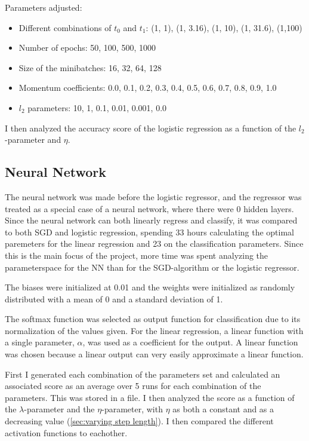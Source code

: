 \documentclass[a4paper, UKenglish]{article}
\newcommand{\0}{\mathbf{0}}
\newcommand{\1}{\mathbf{1}}
\begin{document}
Parameters adjusted:
\begin{itemize}
\item Different combinations of $t_0$ and $t_1$: (1, 1), (1, 3.16), (1, 10), (1, 31.6), (1,100)
\item Number of epochs: 50, 100, 500, 1000
\item Size of the minibatches: 16, 32, 64, 128
\item Momentum coefficients: 0.0, 0.1, 0.2, 0.3, 0.4, 0.5, 0.6, 0.7, 0.8, 0.9, 1.0
\item $l_2$ parameters: 10, 1, 0.1, 0.01, 0.001, 0.0
\end{itemize}

I then analyzed the accuracy score of the logistic regression as a function of the $l_2$-parameter and $\eta$.

\subsection{Neural Network} \label{sec:NN method}
The neural network was made before the logistic regressor, and the regressor was treated as a special case of a neural network, where there were 0 hidden layers. Since the neural network can both linearly regress and classify, it was compared to both SGD and logistic regression, spending 33 hours calculating the optimal paremeters for the linear regression and 23 on the classification parameters. Since this is the main focus of the project, more time was spent analyzing the parameterspace for the NN than for the SGD-algorithm or the logistic regressor.

The biases were initialized at 0.01 and the weights were initialized as randomly distributed with a mean of 0 and a standard deviation of 1.

The softmax function was selected as output function for classification due to its normalization of the values given. For the linear regression, a linear function with a single parameter, $\alpha$, was used as a coefficient for the output. A linear function was chosen because a linear output can very easily approximate a linear function.

First I generated each combination of the parameters set and calculated an associated score as an average over 5 runs for each combination of the parameters. This was stored in a file. I then analyzed the score as a function of the $\lambda$-parameter and the $\eta$-parameter, with $\eta$ as both a constant and as a decreasing value (\autoref{sec:varying step length}). I then compared the different activation functions to eachother.
\end{document}
